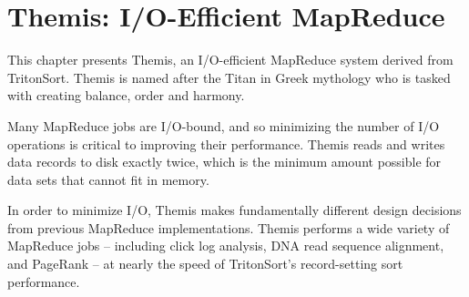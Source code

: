 \chapter{Themis: I/O-Efficient MapReduce}
\label{chapter:themis}

This chapter presents Themis, an I/O-efficient MapReduce system derived from
TritonSort. Themis is named after the Titan in Greek mythology who is tasked
with creating balance, order and harmony.

Many MapReduce jobs are I/O-bound, and so minimizing the number of I/O
operations is critical to improving their performance. Themis reads and writes
data records to disk exactly twice, which is the minimum amount possible for
data sets that cannot fit in memory.

In order to minimize I/O, Themis makes fundamentally different design decisions
from previous MapReduce implementations. Themis performs a wide variety of
MapReduce jobs -- including click log analysis, DNA read sequence alignment,
and PageRank -- at nearly the speed of TritonSort's record-setting sort
performance.









